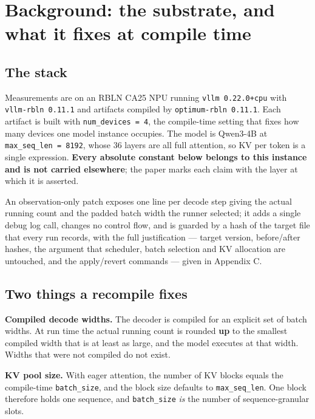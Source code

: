 
\section{Background: the substrate, and what it fixes at compile time}
\label{sec:02}


\subsection{The stack}

Measurements are on an RBLN CA25 NPU running \texttt{vllm 0.22.0+cpu} with \texttt{vllm-rbln 0.11.1} and artifacts compiled by \texttt{optimum-rbln 0.11.1}. Each artifact is built with \texttt{num\_devices = 4}, the compile-time setting that fixes how many devices one model instance occupies. The model is Qwen3-4B at \texttt{max\_seq\_len = 8192}, whose 36 layers are all full attention, so KV per token is a single expression. \textbf{Every absolute constant below belongs to this instance and is not carried elsewhere}; the paper marks each claim with the layer at which it is asserted.

An observation-only patch exposes one line per decode step giving the actual running count and the padded batch width the runner selected; it adds a single debug log call, changes no control flow, and is guarded by a hash of the target file that every run records, with the full justification --- target version, before/after hashes, the argument that scheduler, batch selection and KV allocation are untouched, and the apply/revert commands --- given in Appendix C.

\subsection{Two things a recompile fixes}

\textbf{Compiled decode widths.} The decoder is compiled for an explicit set of batch widths. At run time the actual running count is rounded \textbf{up} to the smallest compiled width that is at least as large, and the model executes at that width. Widths that were not compiled do not exist.

\textbf{KV pool size.} With eager attention, the number of KV blocks equals the compile-time \texttt{batch\_size}, and the block size defaults to \texttt{max\_seq\_len}. One block therefore holds one sequence, and \texttt{batch\_size} \emph{is} the number of sequence-granular slots.

